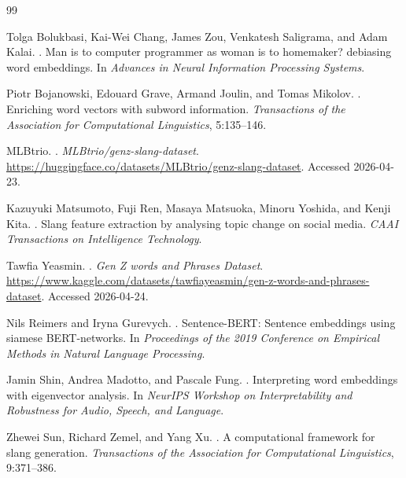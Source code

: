 \documentclass{article}
\begin{document}

\begin{thebibliography}{99}

Tolga Bolukbasi, Kai-Wei Chang, James Zou, Venkatesh Saligrama, and Adam
Kalai.
.
\newblock Man is to computer programmer as woman is to homemaker? debiasing
word embeddings.
\newblock In \emph{Advances in Neural Information Processing Systems}.

Piotr Bojanowski, Edouard Grave, Armand Joulin, and Tomas Mikolov.
.
\newblock Enriching word vectors with subword information.
\newblock \emph{Transactions of the Association for Computational Linguistics},
5:135--146.

MLBtrio.
.
\newblock \emph{MLBtrio/genz-slang-dataset}.
\newblock \url{https://huggingface.co/datasets/MLBtrio/genz-slang-dataset}.
Accessed 2026-04-23.

Kazuyuki Matsumoto, Fuji Ren, Masaya Matsuoka, Minoru Yoshida, and Kenji Kita.
.
\newblock Slang feature extraction by analysing topic change on social media.
\newblock \emph{CAAI Transactions on Intelligence Technology}.

Tawfia Yeasmin.
.
\newblock \emph{Gen Z words and Phrases Dataset}.
\newblock \url{https://www.kaggle.com/datasets/tawfiayeasmin/gen-z-words-and-phrases-dataset}.
Accessed 2026-04-24.

Nils Reimers and Iryna Gurevych.
.
\newblock Sentence-BERT: Sentence embeddings using siamese BERT-networks.
\newblock In \emph{Proceedings of the 2019 Conference on Empirical Methods in
Natural Language Processing}.

Jamin Shin, Andrea Madotto, and Pascale Fung.
.
\newblock Interpreting word embeddings with eigenvector analysis.
\newblock In \emph{NeurIPS Workshop on Interpretability and Robustness for
Audio, Speech, and Language}.

Zhewei Sun, Richard Zemel, and Yang Xu.
.
\newblock A computational framework for slang generation.
\newblock \emph{Transactions of the Association for Computational Linguistics},
9:371--386.


\end{thebibliography}
\end{document}
